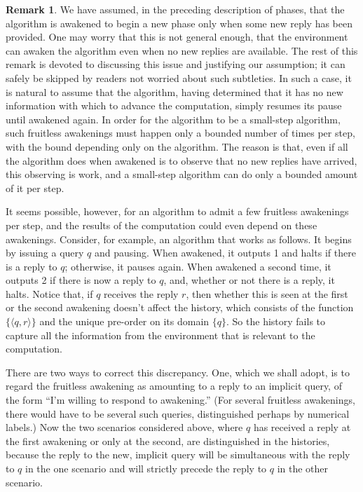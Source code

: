 \documentclass{LMCS}
\theoremstyle{definition}
\newtheorem{rmk}[thm]{Remark}
\newcommand{\sq}[1]{\ensuremath{\langle#1\rangle}}
\begin{document}
\begin{rmk}
  We have assumed, in the preceding description of phases, that the
  algorithm is awakened to begin a new phase only when some new reply
  has been provided.  One may worry that this is not general enough,
  that the environment can awaken the algorithm even when no new
  replies are available.  The rest of this remark is devoted to
  discussing this issue and justifying our assumption; it can safely
  be skipped by readers not worried about such subtleties.
In such a case, it is natural to assume that the
algorithm, having determined that it has no new information with which
to advance the computation, simply resumes its pause until awakened
again.  In order for the algorithm to be a small-step algorithm, such
fruitless awakenings must happen only a bounded number of times per
step, with the bound depending only on the algorithm.  The reason is
that, even if all the algorithm does when awakened is to observe that
no new replies have arrived, this observing is work, and a small-step
algorithm can do only a bounded amount of it per step.

It seems possible, however, for an algorithm to admit a few fruitless
awakenings per step, and the results of the computation could even
depend on these awakenings.  Consider, for example, an algorithm that
works as follows.  It begins by issuing a query $q$ and pausing.  When
awakened, it outputs 1 and halts if there is a reply to $q$;
otherwise, it pauses again.  When awakened a second time, it outputs 2
if there is now a reply to $q$, and, whether or not there is a reply,
it halts.  Notice that, if $q$ receives the reply $r$, then whether
this is seen at the first or the second awakening doesn't affect the
history, which consists of the function $\{\sq{q,r}\}$ and the unique
pre-order on its domain $\{q\}$.  So the history fails to capture all
the information from the environment that is relevant to the
computation.

There are two ways to correct this discrepancy.  One, which we shall
adopt, is to regard the fruitless awakening as amounting to a reply to
an implicit query, of the form ``I'm willing to respond to
awakening.''  (For several fruitless awakenings, there would have to
be several such queries, distinguished perhaps by numerical labels.)
Now the two scenarios considered above, where $q$ has
received a reply at the first awakening or only at the second, are
distinguished in the histories, because the reply to the new, implicit
query will be simultaneous with the reply to $q$ in the one scenario
and will strictly precede the reply to $q$ in the other scenario.


\end{rmk}
\end{document}
